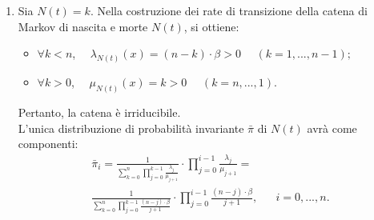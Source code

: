 \documentclass[11pt,largemargins]{homework}
\begin{document}
\begin{enumerate}
     \`E possibile  osservare, allora, che le \emph{active boundaries} di $X(t)$ coincidono e sono solo solo funzioni di $\eta\left(x\right)$:
     \begin{equation*}
     \zeta_{01}\left(x\right)=\sum_{i,j}W_{ij}\left(1-x_{i}\right)x_{j}=\zeta_{10}\left(x\right)=\sum_{i,j}W_{ij}\left(1-x_{j}\right)x_{i}=n+1-\eta\left(x\right).
\end{equation*}     
 Ne risulta che $N\left(t\right)$ è una ``birth-and-death'' chain.\\
 Ponendo $N\left(t\right)=k$, risulta:
 \begin{align*}
 &\lambda_{N\left(t\right)}\left(x\right)=\left(n-k\right)\psi_{01}+\zeta_{01}\left(x\right)\beta\varphi_{01}\left(1\right)=\left(n-k\right)\cdot0+\left(n+1-\eta\left(x\right)\right)\cdot\beta=\left(n-k\right)\cdot\beta,\\
&\mu_{N\left(t\right)}\left(x\right)=k\psi_{10}+\zeta_{10}\left(x\right)\beta\varphi_{10}\left(0\right)=k+\left(n+1-\eta\left(x\right)\right)\cdot\beta\cdot0=k.\\
 \end{align*}
 
 
 \item
 Sia  $N\left(t\right)=k$. Nella costruzione dei rate di transizione della catena di Markov di nascita e morte $N\left(t\right)$, si ottiene: 
\begin{itemize}
\item
$\forall k < n$, \, \, $\lambda_{N\left(t\right)}\left(x\right)=\left(n-k\right)\cdot\beta>0$ \, \, $\left(k=1,...,n-1\right);$
\item
$\forall k >0$, \, \,  $\mu_{N\left(t\right)}\left(x\right)=k>0$ \, \, $\left(k=n,...,1\right).$
\end{itemize}
Pertanto, la catena è irriducibile.\\
L'unica distribuzione di probabilità invariante $\bar{\pi}$ di $N\left(t\right)$ avrà come componenti:
\begin{align*}
\bar{\pi}_{i}=\frac{1}{\sum_{k=0}^{n}\prod_{j=0}^{k-1}\frac{\lambda_{j}}{\mu_{j+1}}}\cdot\prod_{j=0}^{i-1}\frac{\lambda_{j}}{\mu_{j+1}}=\\
\frac{1}{\sum_{k=0}^{n}\prod_{j=0}^{k-1}\frac{\left(n-j\right)\cdot\beta}{j+1}}\cdot\prod_{j=0}^{i-1}\frac{\left(n-j\right)\cdot\beta}{j+1},&&i=0,...,n.
\end{align*}



\end{enumerate}
\end{document}
